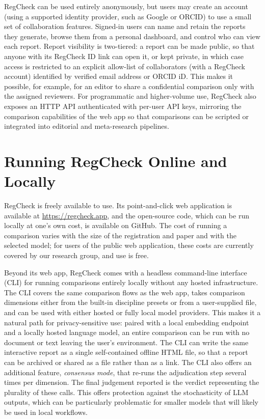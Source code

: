 \documentclass{article}
\begin{document}
RegCheck can be used entirely anonymously, but users may create an account
(using a supported identity provider, such as Google or ORCID) to use a small
set of collaboration features. Signed-in users can name and retain the reports
they generate, browse them from a personal dashboard, and control who can view
each report. Report visibility is two-tiered: a report can be made public, so
that anyone with its RegCheck ID link can open it, or kept private, in which
case access is restricted to an explicit allow-list of collaborators (with a
RegCheck account) identified by verified email address or ORCID iD. This makes
it possible, for example, for an editor to share a confidential comparison only
with the assigned reviewers. For programmatic and higher-volume use, RegCheck
also exposes an HTTP API authenticated with per-user API keys, mirroring the
comparison capabilities of the web app so that comparisons can be scripted or
integrated into editorial and meta-research pipelines.

\section{Running RegCheck Online and Locally}\label{app:local}
RegCheck is freely available to use. Its point-and-click web application is
available at \url{https://regcheck.app}, and the open-source code, which can be
run locally at one's own cost, is available on GitHub. The cost of running a
comparison varies with the size of the registration and paper and with the
selected model; for users of the public web application, these costs are
currently covered by our research group, and use is free.

Beyond its web app, RegCheck comes with a headless command-line interface (CLI)
for running comparisons entirely locally without any hosted infrastructure. The
CLI covers the same comparison flows as the web app, takes comparison dimensions
either from the built-in discipline presets or from a user-supplied file, and
can be used with either hosted or fully local model providers. This makes it a
natural path for privacy-sensitive use: paired with a local embedding endpoint
and a locally hosted language model, an entire comparison can be run with no
document or text leaving the user's environment. The CLI can write the same
interactive report as a single self-contained offline HTML file, so that a
report can be archived or shared as a file rather than as a link. The CLI also
offers an additional feature, \emph{consensus mode}, that re-runs the
adjudication step several times per dimension. The final judgement reported is
the verdict representing the plurality of these calls. This offers protection
against the stochasticity of LLM outputs, which can be particularly problematic
for smaller models that will likely be used in local workflows.
\end{document}
